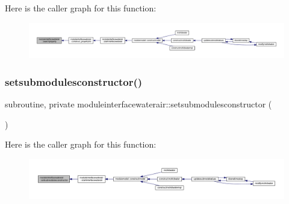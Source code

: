 Here is the caller graph for this function\+:\nopagebreak
\begin{figure}[H]
\begin{center}
\leavevmode
\includegraphics[width=350pt]{namespacemoduleinterfacewaterair_a9b32248d73ce68c55c1d8671b779f48a_icgraph}
\end{center}
\end{figure}
\mbox{\label{namespacemoduleinterfacewaterair_acc8f2f52f650494e800b421332c39060}} 
\subsubsection{\texorpdfstring{setsubmodulesconstructor()}{setsubmodulesconstructor()}}
{\footnotesize\ttfamily subroutine, private moduleinterfacewaterair\+::setsubmodulesconstructor (\begin{DoxyParamCaption}{ }\end{DoxyParamCaption})\hspace{0.3cm}{\ttfamily [private]}}

Here is the caller graph for this function\+:\nopagebreak
\begin{figure}[H]
\begin{center}
\leavevmode
\includegraphics[width=350pt]{namespacemoduleinterfacewaterair_acc8f2f52f650494e800b421332c39060_icgraph}
\end{center}
\end{figure}
\mbox{\label{namespacemoduleinterfacewaterair_a5f28ad0176312886bacef9cc171cb2e1}} 
